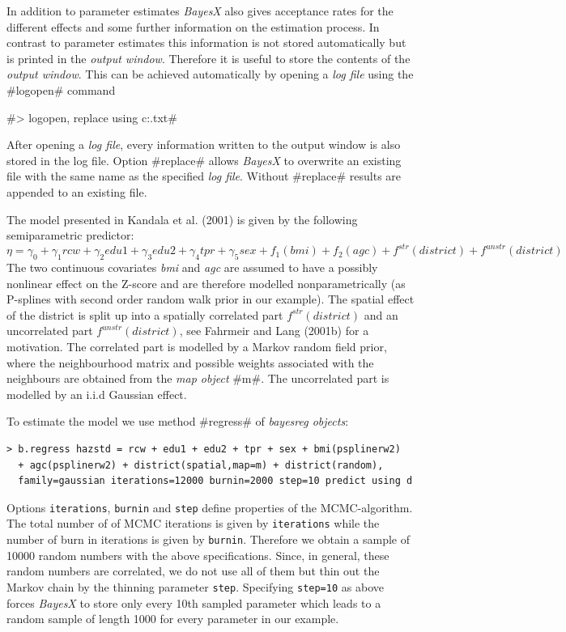 \documentclass{article}
\begin{document}
In addition to parameter estimates {\it BayesX} also gives
acceptance rates for the different effects and some further
information on the estimation process. In contrast to parameter
estimates this information is not stored automatically but is
printed in the {\it output window}. Therefore it is useful to
store the contents of the {\it output window}. This can be
achieved automatically by opening a {\it log file} using the
#logopen# command

#> logopen, replace using c:\data\logmcmc.txt#

After opening a {\it log file}, every information written to the
output window is also stored in the log file. Option #replace#
allows {\it BayesX} to overwrite an existing file with the same
name as the specified {\it log file}. Without #replace# results
are appended to an existing file.

The model presented in Kandala et al. (2001) is given by the
following semiparametric predictor:
\[\eta=\gamma_0+\gamma_1rcw+\gamma_2edu1+\gamma_3edu2+\gamma_4tpr+\gamma_5sex+f_1(bmi)+f_2(agc)+f^{str}(district)+f^{unstr}(district)\]
The two continuous covariates {\em bmi} and {\em agc} are assumed
to have a possibly nonlinear effect on the Z-score and are
therefore modelled nonparametrically (as P-splines with second
order random walk prior in our example). The spatial effect of the
district is split up into a spatially correlated part $
f^{str}(district)$ and an uncorrelated part $f^{unstr}(district)$,
see Fahrmeir and Lang (2001b) \nocite{fahlan01b} for a motivation.
The correlated part is modelled by a Markov random field prior,
where the neighbourhood matrix and possible weights associated
with the neighbours are obtained from the {\it map object} #m#.
The uncorrelated part is modelled by an i.i.d Gaussian effect.

To estimate the model we use method #regress# of {\em bayesreg
objects}:
\begin{verbatim}
> b.regress hazstd = rcw + edu1 + edu2 + tpr + sex + bmi(psplinerw2)
  + agc(psplinerw2) + district(spatial,map=m) + district(random),
  family=gaussian iterations=12000 burnin=2000 step=10 predict using d
\end{verbatim}

Options {\tt iterations}, {\tt burnin} and {\tt step} define
properties of the MCMC-algorithm. The total number of of MCMC
iterations is given by {\tt iterations} while the number of burn
in iterations is given by {\tt burnin}. Therefore we obtain a
sample of 10000 random numbers with the above specifications.
Since, in general, these random numbers are correlated, we do not
use all of them but thin out the Markov chain by the thinning
parameter {\tt step}. Specifying {\tt step=10} as above forces
{\em BayesX} to store only every 10th sampled parameter which
leads to a random sample of length 1000 for every parameter in our
example.
\end{document}
